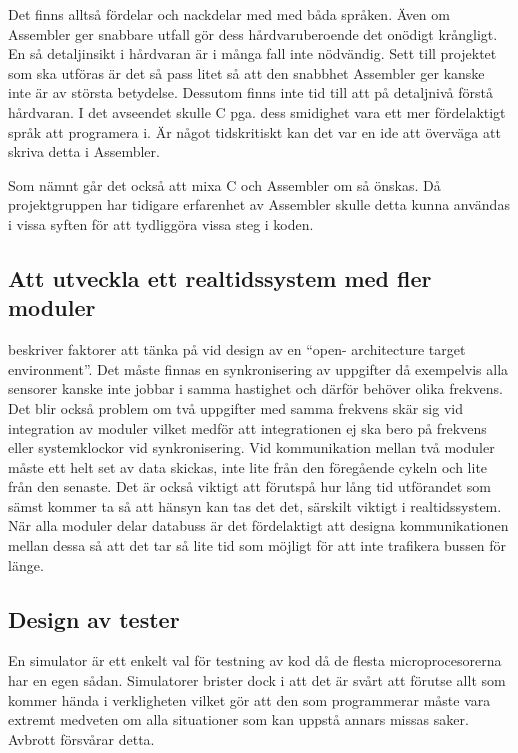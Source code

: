 \documentclass[11pt]{article}
\begin{document}
\begin{flushleft}
Det finns alltså fördelar och nackdelar med med båda språken. Även om Assembler ger snabbare utfall gör dess hårdvaruberoende det onödigt krångligt. En så detaljinsikt i hårdvaran är i många fall inte nödvändig. Sett till projektet som ska utföras är det så pass litet så att den snabbhet Assembler ger kanske inte är av största betydelse. Dessutom finns inte tid till att på detaljnivå förstå hårdvaran. I det avseendet skulle C pga. dess smidighet vara ett mer fördelaktigt språk att programera i. Är något tidskritiskt kan det var en ide att överväga att skriva detta i Assembler. 

Som nämnt går det också att mixa C och Assembler om så önskas. Då projektgruppen har tidigare erfarenhet av Assembler skulle detta kunna användas i vissa syften för att tydliggöra vissa steg i koden. 

\subsection{Att utveckla ett realtidssystem med fler moduler}

\cite{IRS} beskriver faktorer att tänka på vid design av en ``open- architecture target environment''. Det måste finnas en synkronisering av uppgifter då exempelvis alla sensorer kanske inte jobbar i samma hastighet och därför behöver olika frekvens. Det blir också problem om två uppgifter med samma frekvens skär sig vid integration av moduler vilket medför att integrationen ej ska bero på frekvens eller systemklockor vid synkronisering. Vid kommunikation mellan två moduler måste ett  helt set av data skickas, inte lite från den föregående cykeln och lite från den senaste. Det är också viktigt att förutspå hur lång tid utförandet som sämst kommer ta så att hänsyn kan tas det det, särskilt viktigt i realtidssystem. När alla moduler delar databuss är det fördelaktigt att designa kommunikationen mellan dessa så att det tar så lite tid som möjligt för att inte trafikera bussen för länge.   

\subsection{Design av tester}
En simulator är ett enkelt val för testning av kod då de flesta microprocesorerna har en egen sådan. Simulatorer brister dock i att det är svårt att förutse allt som kommer hända i verkligheten vilket gör att den som programmerar måste vara extremt medveten om alla situationer som kan uppstå annars missas saker. Avbrott försvårar detta.\cite{RWD}


\end{flushleft}
\end{document}
